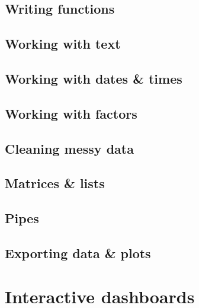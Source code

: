 \documentclass[
]{book}
\begin{document}
\hypertarget{writing-functions}{%
\chapter{Writing functions}\label{writing-functions}}

\hypertarget{working-with-text}{%
\chapter{Working with text}\label{working-with-text}}

\hypertarget{working-with-dates-times}{%
\chapter{Working with dates \& times}\label{working-with-dates-times}}

\hypertarget{working-with-factors}{%
\chapter{Working with factors}\label{working-with-factors}}

\hypertarget{cleaning-messy-data}{%
\chapter{Cleaning messy data}\label{cleaning-messy-data}}

\hypertarget{matrices-lists}{%
\chapter{Matrices \& lists}\label{matrices-lists}}

\hypertarget{pipes}{%
\chapter{Pipes}\label{pipes}}

\hypertarget{exporting-data-plots}{%
\chapter{Exporting data \& plots}\label{exporting-data-plots}}

\hypertarget{part-interactive-dashboards}{%
\part{Interactive dashboards}\label{part-interactive-dashboards}}
\end{document}
